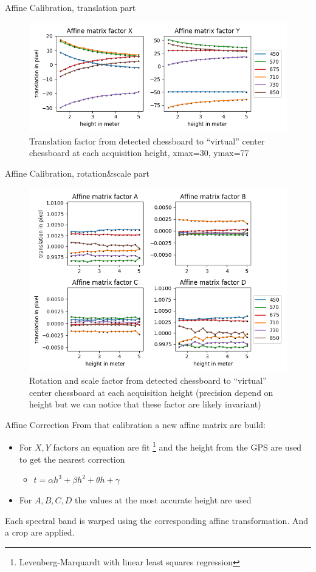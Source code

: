 \documentclass{beamer}
\begin{document}
		\begin{frame}{Affine Calibration, translation part}
			\begin{figure}
				\includegraphics[width=0.7\linewidth]{../figures/affine-translation-height.png}
				\caption{Translation factor from detected chessboard to ``virtual'' center chessboard at each acquisition height, xmax=30, ymax=77}
			\end{figure}
		\end{frame}

		\begin{frame}{Affine Calibration, rotation\&scale part}
			\begin{figure}
				\includegraphics[width=0.7\linewidth]{../figures/affine-rotation-height.png}
				\caption{Rotation and scale factor from detected chessboard to ``virtual'' center chessboard at each acquisition height (precision depend on height but we can notice that these factor are likely invariant)}
			\end{figure}
		\end{frame}
	
		\begin{frame}{Affine Correction}
			From that calibration a new affine matrix are build:
			
			\begin{itemize}
				\item For $X,Y$ factors an equation are fit \footnote{Levenberg-Marquardt with linear least squares regression} and the height from the GPS are used to get the nearest correction
				\begin{itemize}
					\item $t = \alpha h^3 + \beta h^2 + \theta h + \gamma$
				\end{itemize}
				\item For $A,B,C,D$ the values at the most accurate height are used
			\end{itemize}
		
			Each spectral band is warped using the corresponding affine transformation.
			And a crop are applied.
		\end{frame}
	
\end{document}
